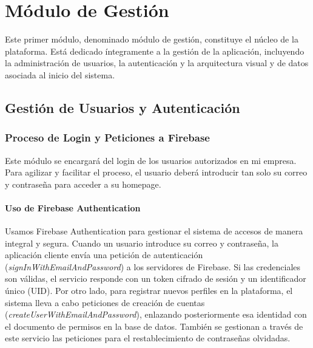 \chapter{Módulo de Gestión} \label{chp:gestion}
Este primer módulo, denominado módulo de gestión, constituye el núcleo de la plataforma. Está dedicado íntegramente a la gestión de la aplicación, incluyendo la administración de usuarios, la autenticación y la arquitectura visual y de datos asociada al inicio del sistema.

\section{Gestión de Usuarios y Autenticación}

\subsection{Proceso de Login y Peticiones a Firebase}

Este módulo se encargará del login de los usuarios autorizados en mi empresa. Para agilizar y facilitar el proceso, el usuario deberá introducir tan solo su correo y contraseña para acceder a su homepage.

\subsubsection{Uso de Firebase Authentication} Usamos Firebase Authentication para gestionar el sistema de accesos de manera integral y segura. Cuando un usuario introduce su correo y contraseña, la aplicación cliente envía una petición de autenticación (\textit{signInWithEmailAndPassword}) a los servidores de Firebase. Si las credenciales son válidas, el servicio responde con un token cifrado de sesión y un identificador único (UID). Por otro lado, para registrar nuevos perfiles en la plataforma, el sistema lleva a cabo peticiones de creación de cuentas (\textit{createUserWithEmailAndPassword}), enlazando posteriormente esa identidad con el documento de permisos en la base de datos. También se gestionan a través de este servicio las peticiones para el restablecimiento de contraseñas olvidadas.

